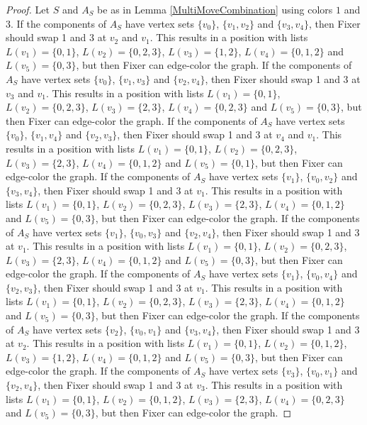 \documentclass[12pt]{amsart}
\theoremstyle{plain}
\theoremstyle{definition}
\theoremstyle{remark}
\begin{document}
\begin{proof}
Let $S$ and $A_S$ be as in Lemma \ref{MultiMoveCombination} using colors $1$ and $3$. If the components of $A_S$ have vertex sets $\{v_0\}$, $\{v_1, v_2\}$ and $\{v_3, v_4\}$, then Fixer should swap 1 and 3 at $v_2$ and $v_1$. This results in a position with lists $L(v_1) = \{0, 1\}$, $L(v_2) = \{0, 2, 3\}$, $L(v_3) = \{1, 2\}$, $L(v_4) = \{0, 1, 2\}$ and $L(v_5) = \{0, 3\}$, but then Fixer can edge-color the graph.
If the components of $A_S$ have vertex sets $\{v_0\}$, $\{v_1, v_3\}$ and $\{v_2, v_4\}$, then Fixer should swap 1 and 3 at $v_3$ and $v_1$. This results in a position with lists $L(v_1) = \{0, 1\}$, $L(v_2) = \{0, 2, 3\}$, $L(v_3) = \{2, 3\}$, $L(v_4) = \{0, 2, 3\}$ and $L(v_5) = \{0, 3\}$, but then Fixer can edge-color the graph.
If the components of $A_S$ have vertex sets $\{v_0\}$, $\{v_1, v_4\}$ and $\{v_2, v_3\}$, then Fixer should swap 1 and 3 at $v_4$ and $v_1$. This results in a position with lists $L(v_1) = \{0, 1\}$, $L(v_2) = \{0, 2, 3\}$, $L(v_3) = \{2, 3\}$, $L(v_4) = \{0, 1, 2\}$ and $L(v_5) = \{0, 1\}$, but then Fixer can edge-color the graph.
If the components of $A_S$ have vertex sets $\{v_1\}$, $\{v_0, v_2\}$ and $\{v_3, v_4\}$, then Fixer should swap 1 and 3 at $v_1$. This results in a position with lists $L(v_1) = \{0, 1\}$, $L(v_2) = \{0, 2, 3\}$, $L(v_3) = \{2, 3\}$, $L(v_4) = \{0, 1, 2\}$ and $L(v_5) = \{0, 3\}$, but then Fixer can edge-color the graph.
If the components of $A_S$ have vertex sets $\{v_1\}$, $\{v_0, v_3\}$ and $\{v_2, v_4\}$, then Fixer should swap 1 and 3 at $v_1$. This results in a position with lists $L(v_1) = \{0, 1\}$, $L(v_2) = \{0, 2, 3\}$, $L(v_3) = \{2, 3\}$, $L(v_4) = \{0, 1, 2\}$ and $L(v_5) = \{0, 3\}$, but then Fixer can edge-color the graph.
If the components of $A_S$ have vertex sets $\{v_1\}$, $\{v_0, v_4\}$ and $\{v_2, v_3\}$, then Fixer should swap 1 and 3 at $v_1$. This results in a position with lists $L(v_1) = \{0, 1\}$, $L(v_2) = \{0, 2, 3\}$, $L(v_3) = \{2, 3\}$, $L(v_4) = \{0, 1, 2\}$ and $L(v_5) = \{0, 3\}$, but then Fixer can edge-color the graph.
If the components of $A_S$ have vertex sets $\{v_2\}$, $\{v_0, v_1\}$ and $\{v_3, v_4\}$, then Fixer should swap 1 and 3 at $v_2$. This results in a position with lists $L(v_1) = \{0, 1\}$, $L(v_2) = \{0, 1, 2\}$, $L(v_3) = \{1, 2\}$, $L(v_4) = \{0, 1, 2\}$ and $L(v_5) = \{0, 3\}$, but then Fixer can edge-color the graph.
If the components of $A_S$ have vertex sets $\{v_3\}$, $\{v_0, v_1\}$ and $\{v_2, v_4\}$, then Fixer should swap 1 and 3 at $v_3$. This results in a position with lists $L(v_1) = \{0, 1\}$, $L(v_2) = \{0, 1, 2\}$, $L(v_3) = \{2, 3\}$, $L(v_4) = \{0, 2, 3\}$ and $L(v_5) = \{0, 3\}$, but then Fixer can edge-color the graph.

\end{proof}
\end{document}
